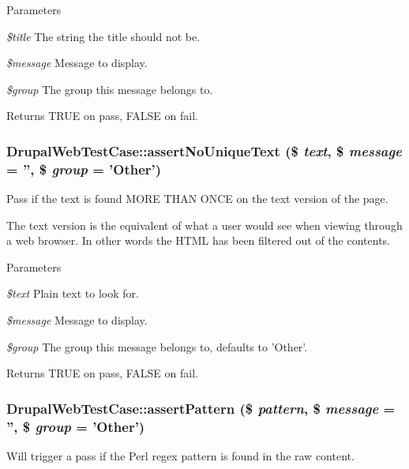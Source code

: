 \begin{DoxyParams}{Parameters}
\item[{\em \$title}]The string the title should not be. \item[{\em \$message}]Message to display. \item[{\em \$group}]The group this message belongs to. \end{DoxyParams}
\begin{DoxyReturn}{Returns}
TRUE on pass, FALSE on fail. 
\end{DoxyReturn}
\hypertarget{class_drupal_web_test_case_a058c82a867e22a61b68891a009294e7b}{
\subsubsection[{assertNoUniqueText}]{\setlength{\rightskip}{0pt plus 5cm}DrupalWebTestCase::assertNoUniqueText (\$ {\em text}, \/  \$ {\em message} = {\ttfamily ''}, \/  \$ {\em group} = {\ttfamily 'Other'})}}
\label{class_drupal_web_test_case_a058c82a867e22a61b68891a009294e7b}
Pass if the text is found MORE THAN ONCE on the text version of the page.

The text version is the equivalent of what a user would see when viewing through a web browser. In other words the HTML has been filtered out of the contents.


\begin{DoxyParams}{Parameters}
\item[{\em \$text}]Plain text to look for. \item[{\em \$message}]Message to display. \item[{\em \$group}]The group this message belongs to, defaults to 'Other'. \end{DoxyParams}
\begin{DoxyReturn}{Returns}
TRUE on pass, FALSE on fail. 
\end{DoxyReturn}
\hypertarget{class_drupal_web_test_case_a5838fb78298156ab4de6a2ff5cdc4f8b}{
\subsubsection[{assertPattern}]{\setlength{\rightskip}{0pt plus 5cm}DrupalWebTestCase::assertPattern (\$ {\em pattern}, \/  \$ {\em message} = {\ttfamily ''}, \/  \$ {\em group} = {\ttfamily 'Other'})}}
\label{class_drupal_web_test_case_a5838fb78298156ab4de6a2ff5cdc4f8b}
Will trigger a pass if the Perl regex pattern is found in the raw content.


